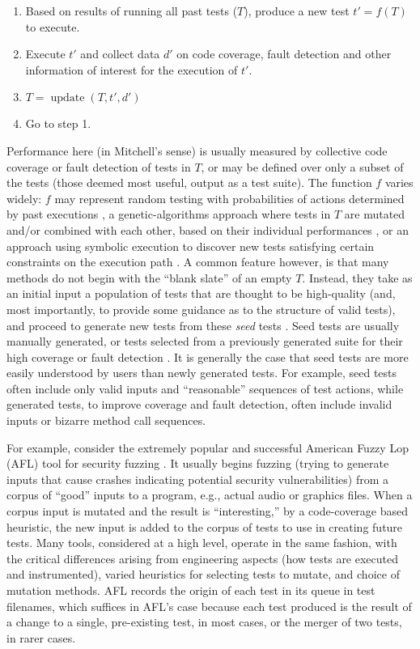 \documentclass[final]{article}
\DeclareMathOperator{\Update}{update}
\begin{document}
\begin{enumerate}
\item Based on results of running all past tests ($T$), produce a new test
  $t' = f(T)$ to execute.
\item Execute $t'$ and collect data $d'$ on code coverage, fault detection and other
  information of interest for the execution of $t'$.
\item $T = \Update(T,t',d')$
\item Go to step 1.
\end{enumerate}

Performance here (in Mitchell's sense) is usually measured by
collective code coverage or fault detection of tests in $T$, or may be
defined over only a subset of the tests (those deemed most useful,
output as a test suite).  The function $f$ varies widely: $f$ may
represent random testing with probabilities of actions determined by
past executions \cite{AndrewsL07}, a genetic-algorithms approach where
tests in $T$ are mutated and/or combined with each other, based on
their individual performances
\cite{McMinn04search-basedsoftware,FA11,aflfuzz}, or an approach using
symbolic execution to discover new tests satisfying certain
constraints on the execution path \cite{Whitebox,GodefroidKS05,KLEE}.
A common feature however, is that many methods do not begin with the
``blank slate'' of an empty $T$.  Instead, they take as an initial
input a population of tests that are thought to be high-quality (and,
most importantly, to provide some guidance as to the structure of
valid tests), and proceed to generate new tests from these \emph{seed}
tests
\cite{aflfuzz,Person:2011:DIS:1993498.1993558,Marinescu:2012:MTS:2337223.2337308,issta14,STVR_seeding}.
Seed tests are usually manually generated, or tests selected from a
previously generated suite for their high coverage or fault detection
\cite{YooHarman,stvrcausereduce}.  It is generally the case that seed
tests are more easily understood by users than newly generated tests.
For example, seed tests often include only valid inputs and
``reasonable'' sequences of test actions, while generated tests, to
improve coverage and fault detection, often include invalid inputs or
bizarre method call sequences.

For example, consider the extremely popular and successful American
Fuzzy Lop (AFL) tool
for security fuzzing \cite{aflfuzz}.  It usually begins fuzzing
(trying to generate inputs that cause crashes indicating potential
security vulnerabilities) from a corpus of ``good'' inputs to a
program, e.g., actual audio or graphics files.  When a corpus input is mutated and the result is
``interesting,'' by a code-coverage based heuristic, the new input is
added to the corpus of tests to use in creating future tests.  Many
tools, considered at a high level, operate in the same fashion, with the
critical differences arising from engineering aspects (how tests are executed
and instrumented), varied heuristics for selecting tests to mutate,
and choice of mutation methods.  AFL records the origin of each test
in its queue in test filenames, which suffices in AFL's case because
each test produced is the result of a change to a single, pre-existing
test, in most cases, or the merger of two tests, in rarer cases.
\end{document}
